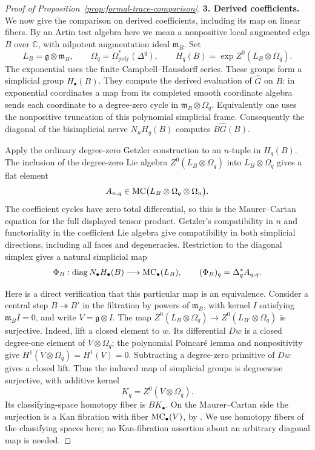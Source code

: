 \begin{proof}[Proof of Proposition~\ref{prop:formal-trace-comparison}]
\smallskip\noindent\textbf{3. Derived coefficients.}\quad
We now give the comparison on derived coefficients, including its map on
linear fibers.  By an Artin test algebra here we mean a nonpositive local
augmented cdga \(B\) over \(\mathbb C\), with nilpotent augmentation
ideal \(\mathfrak m_B\).  Set
\[
 L_B=\mathfrak g\otimes\mathfrak m_B,
 \qquad \Omega_q=\Omega^*_{\mathrm{poly}}(\Delta^q),
 \qquad H_q(B)=\exp Z^0(L_B\otimes\Omega_q).
\]
The exponential uses the finite Campbell--Hausdorff series.  These groups
form a simplicial group \(H_\bullet(B)\).  They compute the derived
evaluation of \(\widehat G\) on \(B\): in exponential coordinates a
map from its completed smooth coordinate algebra sends each coordinate
to a degree-zero cycle in \(\mathfrak m_B\otimes\Omega_q\).  Equivalently
one uses the nonpositive truncation of this polynomial simplicial frame.
Consequently the diagonal of the bisimplicial nerve
\(N_nH_q(B)\) computes \(B\widehat G(B)\).

Apply the ordinary degree-zero Getzler construction to an \(n\)-tuple
in \(H_q(B)\).  The inclusion of the degree-zero Lie algebra
\(Z^0(L_B\otimes\Omega_q)\) into \(L_B\otimes\Omega_q\) gives a
flat element
\[
 A_{n,q}\in
 \operatorname{MC}\bigl(L_B\otimes\Omega_q\otimes\Omega_n\bigr).
\]
The coefficient cycles have zero total differential, so this is the
Maurer--Cartan equation for the full displayed tensor product.
Getzler's compatibility in \(n\) and functoriality in the coefficient
Lie algebra give compatibility in both simplicial directions, including
all faces and degeneracies.  Restriction to the diagonal simplex gives
a natural simplicial map
\begin{equation}
\label{eq:explicit-dg-nerve-comparison}
 \Phi_B:\operatorname{diag}N_\bullet H_\bullet(B)
                  \longrightarrow\operatorname{MC}_\bullet(L_B),
 \qquad
 (\Phi_B)_q=\Delta_q^*A_{q,q}.
\end{equation}

Here is a direct verification that this particular map is an equivalence.
Consider a central step \(B\twoheadrightarrow B'\) in the filtration
by powers of \(\mathfrak m_B\), with kernel \(I\) satisfying
\(\mathfrak m_BI=0\), and write \(V=\mathfrak g\otimes I\).
The map \(Z^0(L_B\otimes\Omega_q)\to
Z^0(L_{B'}\otimes\Omega_q)\) is surjective.  Indeed, lift a closed
element to \(w\).  Its differential \(Dw\) is a closed degree-one
element of \(V\otimes\Omega_q\); the polynomial Poincar\'e lemma and
nonpositivity give
\(H^1(V\otimes\Omega_q)=H^1(V)=0\).  Subtracting a degree-zero
primitive of \(Dw\) gives a closed lift.  Thus the induced map of
simplicial groups is degreewise surjective, with additive kernel
\[
                         K_q=Z^0(V\otimes\Omega_q).
\]
Its classifying-space homotopy fiber is \(BK_\bullet\).
On the Maurer--Cartan side the surjection is a Kan fibration with fiber
\(\operatorname{MC}_\bullet(V)\), by \cite[Proposition~4.7]{Getzler2009}.
We use homotopy fibers of the classifying spaces here; no Kan-fibration
assertion about an arbitrary diagonal map is needed.


\end{proof}
